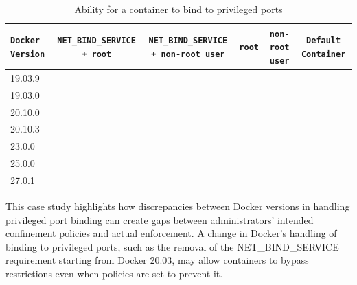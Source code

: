 \documentclass[12pt]{report}
\newcommand{\cmark}{\ding{51}} %
\newcommand{\xmark}{\ding{55}} %
\providecommand{\DIFaddbegin}{} %
\providecommand{\DIFaddend}{} %
\providecommand{\DIFdelbegin}{} %
\providecommand{\DIFdelend}{} %
\newcommand{\DIFscaledelfig}{0.5}
\newlength{\DIFdelgraphicswidth} %
\newlength{\DIFdelgraphicsheight} %
\newcommand{\DIFaddincludegraphics}[2][]{{\color{blue}\fbox{\DIFOincludegraphics[#1]{#2}}}} %
\newcommand{\DIFdelincludegraphics}[2][]{%
\sbox{\DIFdelgraphicsbox}{\DIFOincludegraphics[#1]{#2}}%
\settoboxwidth{\DIFdelgraphicswidth}{\DIFdelgraphicsbox} %
\settoboxtotalheight{\DIFdelgraphicsheight}{\DIFdelgraphicsbox} %
\scalebox{\DIFscaledelfig}{%
\parbox[b]{\DIFdelgraphicswidth}{\usebox{\DIFdelgraphicsbox}\\[-\baselineskip] \rule{\DIFdelgraphicswidth}{0em}}\llap{\resizebox{\DIFdelgraphicswidth}{\DIFdelgraphicsheight}{%
\setlength{\unitlength}{\DIFdelgraphicswidth}%
\begin{picture}(1,1)%
\thicklines\linethickness{2pt} %
{\color[rgb]{1,0,0}\put(0,0){\framebox(1,1){}}}%
{\color[rgb]{1,0,0}\put(0,0){\line( 1,1){1}}}%
{\color[rgb]{1,0,0}\put(0,1){\line(1,-1){1}}}%
\end{picture}%
}\hspace*{3pt}}} %
} %
\DeclareRobustCommand{\DIFaddbegin}{\DIFOaddbegin \let\includegraphics\DIFaddincludegraphics} %
\DeclareRobustCommand{\DIFaddend}{\DIFOaddend \let\includegraphics\DIFOincludegraphics} %
\DeclareRobustCommand{\DIFdelbegin}{\DIFOdelbegin \let\includegraphics\DIFdelincludegraphics} %
\DeclareRobustCommand{\DIFdelend}{\DIFOaddend \let\includegraphics\DIFOincludegraphics} %
\begin{document}
\begin{doublespace}
\begin{table}
    \centering
    \caption{Ability for a container to bind to privileged ports}
    \label{tab:port-binding-pre-20.03}
    \scriptsize
    \begin{tabular}{|p{2.5cm}|c|c|c|c|c|}
        \hline
        \texttt{Docker Version} & \texttt{NET\_BIND\_SERVICE + root} & \texttt{NET\_BIND\_SERVICE + non-root user} & \texttt{root} & \texttt{non-root user} & \texttt{Default Container} \\ \hline
        19.03.9                & \cmark                         & \xmark                               & \xmark      & \xmark           & \xmark                                      \\ \hline
        19.03.0                & \cmark                         & \xmark                               & \xmark      & \xmark           & \xmark                                      \\ \hline
        20.10.0                & \cmark                         & \xmark                              & \xmark      & \xmark           & \xmark                                      \\ \hline
        20.10.3                & \cmark                         & \DIFdelbegin %
\DIFdelend \DIFaddbegin \cmark                              \DIFaddend & \DIFdelbegin %
\DIFdelend \DIFaddbegin \cmark      \DIFaddend & \xmark           & \xmark                                      \\ \hline
        23.0.0                 & \cmark                         & \cmark                              & \cmark      & \xmark           & \xmark                                      \\ \hline
        25.0.0                 & \cmark                         & \cmark                              & \cmark      & \xmark           & \xmark                                      \\ \hline
        27.0.1                 & \cmark                         & \cmark                              & \cmark      & \xmark           & \xmark                                      \\ \hline
    \end{tabular}
\end{table}

This case study highlights how discrepancies between Docker versions in handling privileged port binding can create gaps between administrators' intended confinement policies and actual enforcement. A change in Docker's handling of binding to privileged ports, such as the removal of the NET\_BIND\_SERVICE requirement starting from Docker 20.03, may allow containers to bypass restrictions even when policies are set to prevent it. 


\end{doublespace}
\end{document}
